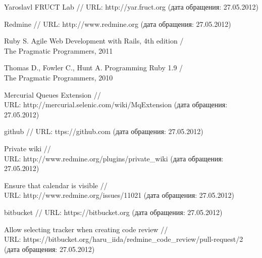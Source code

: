 \begin{thebibliography}{99}

Yaroslavl FRUCT Lab  // URL:
http://yar.fruct.org (дата обращения: 27.05.2012)

Redmine  // URL:
http://www.redmine.org (дата обращения: 27.05.2012)

Ruby S. Agile Web Development with Rails, 4th edition / \\ The Pragmatic
Programmers, 2011

Thomas D., Fowler C., Hunt A. Programming Ruby 1.9 / \\ The Pragmatic
Programmers, 2010

Mercurial Queues Extension // \\ URL:
http://mercurial.selenic.com/wiki/MqExtension (дата обращения: 27.05.2012)

github // URL: ttps://github.com (дата обращения: 27.05.2012)

Private wiki // \\ URL:
http://www.redmine.org/plugins/private\_wiki (дата обращения: 27.05.2012)

Ensure that calendar is visible // \\ URL:
http://www.redmine.org/issues/11021 (дата обращения: 27.05.2012)

bitbucket // URL: 
https://bitbucket.org (дата обращения: 27.05.2012)

Allow selecting tracker when creating code review // \\ URL: 
https://bitbucket.org/haru\_iida/redmine\_code\_review/pull-request/2 \\
(дата обращения: 27.05.2012)

\end{thebibliography}
